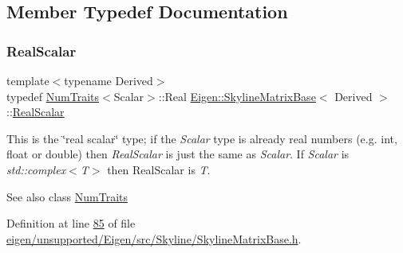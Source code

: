 \subsection{Member Typedef Documentation}
\mbox{\label{class_eigen_1_1_skyline_matrix_base_a24c532ab7e339b956a637a4a968e1565}} 
\subsubsection{\texorpdfstring{Real\+Scalar}{RealScalar}\hspace{0.1cm}{\footnotesize\ttfamily [1/2]}}
{\footnotesize\ttfamily template$<$typename Derived$>$ \\
typedef \hyperlink{group___core___module_struct_eigen_1_1_num_traits}{Num\+Traits}$<$Scalar$>$\+::Real \hyperlink{class_eigen_1_1_skyline_matrix_base}{Eigen\+::\+Skyline\+Matrix\+Base}$<$ Derived $>$\+::\hyperlink{class_eigen_1_1_skyline_matrix_base_a24c532ab7e339b956a637a4a968e1565}{Real\+Scalar}}

This is the \char`\"{}real scalar\char`\"{} type; if the {\itshape Scalar} type is already real numbers (e.\+g. int, float or double) then {\itshape Real\+Scalar} is just the same as {\itshape Scalar}. If {\itshape Scalar} is {\itshape std\+::complex$<$\+T$>$} then Real\+Scalar is {\itshape T}.

\begin{DoxySeeAlso}{See also}
class \hyperlink{group___core___module_struct_eigen_1_1_num_traits}{Num\+Traits} 
\end{DoxySeeAlso}


Definition at line \hyperlink{eigen_2unsupported_2_eigen_2src_2_skyline_2_skyline_matrix_base_8h_source_l00085}{85} of file \hyperlink{eigen_2unsupported_2_eigen_2src_2_skyline_2_skyline_matrix_base_8h_source}{eigen/unsupported/\+Eigen/src/\+Skyline/\+Skyline\+Matrix\+Base.\+h}.

\mbox{\label{class_eigen_1_1_skyline_matrix_base_a24c532ab7e339b956a637a4a968e1565}} 
